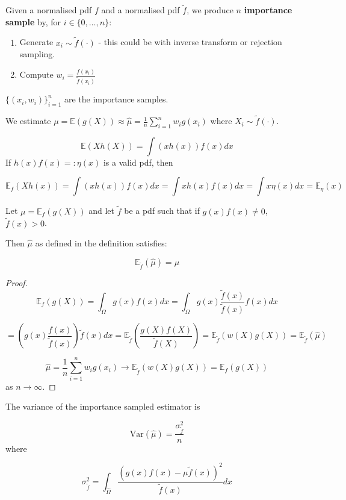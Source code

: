 \begin{definition}
	Given a normalised pdf $f$ and a normalised pdf $\tilde{f}$, we produce $n$ \textbf{importance sample} by, for $i \in \{0, \dots, n\}$:
	\begin{enumerate}
		\item Generate $x_i \sim \tilde{f}(\cdot)$ - this could be with inverse transform or rejection sampling.
		\item Compute $w_i = \frac{f(x_i)}{\tilde{f}(x_i)}$
	\end{enumerate}

	$\{ (x_i, w_i) \}_{i = 1}^n$ are the importance samples.

	We estimate $\mu = \mathbb{E}(g(X)) \approx \hat{\mu} = \frac{1}{n} \sum_{i = 1}^n w_i g(x_i)$ where $X_i \sim \tilde{f}(\cdot)$.

	\[ \mathbb{E}(X h(X)) = \int (x h(x)) f(x) dx \]
	If $h(x) f(x) =: \eta (x)$ is a valid pdf, then

	\[ \mathbb{E}_f (X h(x)) = \int (x h(x)) f(x) dx = \int x h(x) f(x) dx = \int x \eta(x) dx = \mathbb{E}_{\eta} (x) \]
\end{definition}

\begin{theorem}
	Let $\mu = \mathbb{E}_f (g(X))$ and let $\tilde{f}$ be a pdf such that if $g(x) f(x) \ne 0$, $\tilde{f}(x) > 0$.

	Then $\hat{\mu}$ as defined in the definition satisfies:

	\[ \mathbb{E}_{\tilde{f}} (\hat{\mu}) = \mu \]
\end{theorem}

\begin{proof}
	\[ \mathbb{E}_f (g(X)) = \int_{\Omega} g(x) f(x) dx = \int_{\Omega} g(x) \frac{\tilde{f}(x)}{\tilde{f}(x)} f(x) dx \]

	\[ = \left( g(x) \frac{f(x)}{\tilde{f}(x)} \right) \tilde{f}(x) dx = \mathbb{E}_{\tilde{f}} (\frac{g(X) f(X)}{\tilde{f}(X)}) = \mathbb{E}_{\tilde{f}} (w(X) g(X)) = \mathbb{E}_{\tilde{f}} (\hat{\mu}) \]

	\[ \hat{\mu} = \frac{1}{n} \sum_{i = 1}^n w_i g(x_i) \rightarrow \mathbb{E}_{\tilde{f}} (w(X) g(X)) = \mathbb{E}_f (g(X)) \]
	as $n \rightarrow \infty$.
\end{proof}

\begin{theorem}
	The variance of the importance sampled estimator is

	\[ \text{Var} (\hat{\mu}) = \frac{\sigma_{\tilde{f}}^2}{n} \]
	where

	\[ \sigma_{\tilde{f}}^2 = \int_{\hat{\Omega}} \frac{(g(x) f(x) - \mu \tilde{f}(x))^2}{\tilde{f}(x)} dx \]
\end{theorem}

